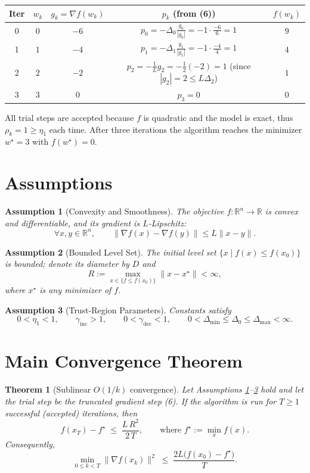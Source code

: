 \documentclass{article}
\newtheorem{theorem}{Theorem}
\newtheorem{assumption}{Assumption}
\begin{document}
\begin{center}
\begin{tabular}{c|c|c|c|c}
\textbf{Iter} & $w_k$ & $g_k= \nabla f(w_k)$ & $p_k$ (from (6)) & $f(w_k)$ \\ \hline
0 & $0$ & $-6$ & $p_0 = -\Delta_0\frac{g_0}{|g_0|}= -1\cdot\frac{-6}{6}= 1$ & $9$\\
1 & $1$ & $-4$ & $p_1 = -\Delta_1\frac{g_1}{|g_1|}= -1\cdot\frac{-4}{4}= 1$ & $4$\\
2 & $2$ & $-2$ & $p_2 = -\frac{1}{L}g_2 = -\frac12(-2)=1$ (since $|g_2|=2\le L\Delta_2$) & $1$\\
3 & $3$ & $0$  & $p_3=0$ & $0$
\end{tabular}
\end{center}
All trial steps are accepted because $f$ is quadratic and the model is exact, thus $\rho_k=1\ge\eta_1$ each time.  After three iterations the algorithm reaches the minimizer $w^\star=3$ with $f(w^\star)=0$.

\section*{Assumptions}
\begin{assumption}[Convexity and Smoothness]\label{ass:convex}
The objective $f:\mathbb{R}^n\to\mathbb{R}$ is convex and differentiable, and its gradient is $L$‑Lipschitz:
\[
\forall x,y\in\mathbb{R}^n,\qquad
\|\nabla f(x)-\nabla f(y)\|\le L\|x-y\|.
\]
\end{assumption}
\begin{assumption}[Bounded Level Set]\label{ass:bounded}
The initial level set $\{x\mid f(x)\le f(x_0)\}$ is bounded; denote its diameter by $D$ and
\[
R:=\max_{x\in\{f\le f(x_0)\}}\|x-x^\star\|<\infty,
\]
where $x^\star$ is any minimizer of $f$.
\end{assumption}
\begin{assumption}[Trust‑Region Parameters]\label{ass:params}
Constants satisfy
\[
0<\eta_1<1,\qquad
\gamma_{\text{inc}}>1,\qquad
0<\gamma_{\text{dec}}<1,\qquad
0<\Delta_{\min}\le\Delta_0\le\Delta_{\max}<\infty .
\]
\end{assumption}

\section*{Main Convergence Theorem}
\begin{theorem}[Sublinear $O(1/k)$ convergence]\label{thm:sublinear}
Let Assumptions \ref{ass:convex}–\ref{ass:params} hold and let the trial step be the truncated gradient step (6).  
If the algorithm is run for $T\ge1$ successful (accepted) iterations, then
\[
f(x_T)-f^\star \;\le\; \frac{L\,R^{2}}{2\,T},
\qquad\text{where }f^\star:=\min_{x}f(x).
\tag{7}
\]
Consequently,
\[
\min_{0\le k<T}\|\nabla f(x_k)\|^{2}\;\le\;\frac{2L\bigl(f(x_0)-f^\star\bigr)}{T}.
\tag{8}
\]
\end{theorem}
\end{document}
